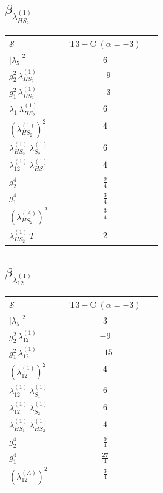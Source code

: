 \documentclass[9pt]{article}
\begin{document}
\subsection*{$ \beta_{\lambda_{HS_2}^{(1)}} $}
\begin{longtable}{@{}p{0.31\linewidth}c@{}}
\toprule
$\mathcal{S}$ & $ \mathrm{T3-C}\;(\alpha=-3) $ \\
\midrule
$ |\lambda_5|^2 $ & $ 6 $ \\
$ g_2^2\,\lambda_{HS_2}^{(1)} $ & $ -9 $ \\
$ g_1^2\,\lambda_{HS_2}^{(1)} $ & $ -3 $ \\
$ \lambda_1\,\lambda_{HS_2}^{(1)} $ & $ 6 $ \\
$ \left(\lambda_{HS_2}^{(1)}\right)^2 $ & $ 4 $ \\
$ \lambda_{HS_2}^{(1)}\,\lambda_{S_2}^{(1)} $ & $ 6 $ \\
$ \lambda_{12}^{(1)}\,\lambda_{HS_1}^{(1)} $ & $ 4 $ \\
$ g_2^4 $ & $ \frac{9}{4} $ \\
$ g_1^4 $ & $ \frac{3}{4} $ \\
$ \left(\lambda_{HS_2}^{(A)}\right)^2 $ & $ \frac{3}{4} $ \\
$ \lambda_{HS_2}^{(1)}\,T $ & $ 2 $ \\
\bottomrule
\end{longtable}
\subsection*{$ \beta_{\lambda_{12}^{(1)}} $}
\begin{longtable}{@{}p{0.31\linewidth}c@{}}
\toprule
$\mathcal{S}$ & $ \mathrm{T3-C}\;(\alpha=-3) $ \\
\midrule
$ |\lambda_5|^2 $ & $ 3 $ \\
$ g_2^2\,\lambda_{12}^{(1)} $ & $ -9 $ \\
$ g_1^2\,\lambda_{12}^{(1)} $ & $ -15 $ \\
$ \left(\lambda_{12}^{(1)}\right)^2 $ & $ 4 $ \\
$ \lambda_{12}^{(1)}\,\lambda_{S_1}^{(1)} $ & $ 6 $ \\
$ \lambda_{12}^{(1)}\,\lambda_{S_2}^{(1)} $ & $ 6 $ \\
$ \lambda_{HS_1}^{(1)}\,\lambda_{HS_2}^{(1)} $ & $ 4 $ \\
$ g_2^4 $ & $ \frac{9}{4} $ \\
$ g_1^4 $ & $ \frac{27}{4} $ \\
$ \left(\lambda_{12}^{(A)}\right)^2 $ & $ \frac{3}{4} $ \\
\bottomrule
\end{longtable}
\end{document}
